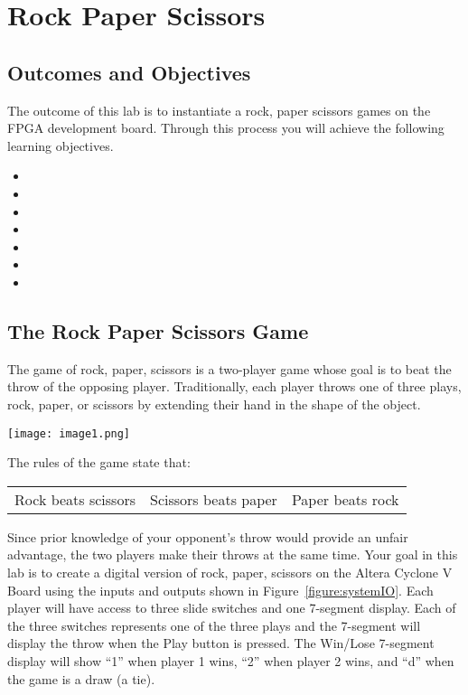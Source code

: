 \chapter{Rock Paper Scissors}
\label{RPS}
\graphicspath{ {./Lab03RockPaperScissor/Fig} }

\section{Outcomes and Objectives}

The outcome of this lab is to instantiate a rock, paper scissors games
on the FPGA development board.
Through this process you will achieve the following
learning objectives.
\begin{itemize}
        \itemsep=0em
    \item {}
    \item {}
    \item {}
    \item {}
    \item {}
    \item {}
    \item {}
\end{itemize}

\section{The Rock Paper Scissors Game}

The game of rock, paper, scissors is a two-player game whose goal is to
beat the throw of the opposing player. Traditionally, each player throws
one of three plays, rock, paper, or scissors by extending their hand in
the shape of the object.

\texttt{[image:  image1.png]}

The rules of the game state that:

\begin{tabular}{p{4cm}p{4cm}p{4cm}}
    Rock beats scissors  & Scissors beats paper & Paper beats rock \\
\end{tabular}

Since prior knowledge of your opponent's throw would provide an unfair
advantage, the two players make their throws at the same time. Your goal
in this lab is to create a digital version of rock, paper,
scissors on the Altera Cyclone V Board using the inputs and outputs
shown in Figure~\ref{figure:systemIO}. Each player will have access to three slide switches
and one 7-segment display. Each of the three switches represents one of
the three plays and the 7-segment will display the throw when the Play
button is pressed. The Win/Lose 7-segment display will show ``1'' when
player 1 wins, ``2'' when player 2 wins, and ``d'' when the game is a
draw (a tie).

